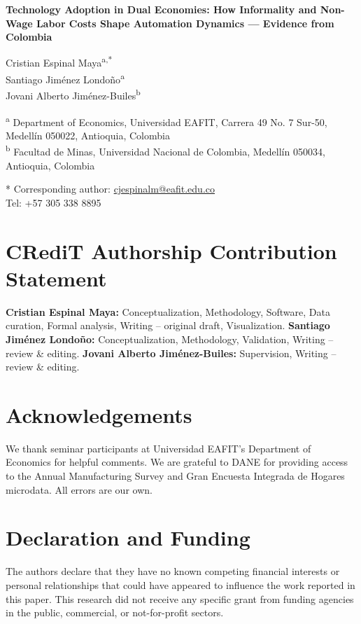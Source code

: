 \documentclass[12pt]{article}
\begin{document}
\begin{center}
{\LARGE\bfseries Technology Adoption in Dual Economies: How Informality and Non-Wage Labor Costs Shape Automation Dynamics --- Evidence from Colombia}
\vspace{1cm}

{\large Cristian Espinal Maya\textsuperscript{a,*} }\\
{\large Santiago Jim\'enez Londo\~no\textsuperscript{a} }\\
{\large Jovani Alberto Jim\'enez-Builes\textsuperscript{b} }

\vspace{0.5cm}
\textsuperscript{a} Department of Economics, Universidad EAFIT, Carrera 49 No. 7 Sur-50, Medell\'in 050022, Antioquia, Colombia\\
\textsuperscript{b} Facultad de Minas, Universidad Nacional de Colombia, Medell\'in 050034, Antioquia, Colombia

\vspace{0.5cm}
* Corresponding author: \href{mailto:cjespinalm@eafit.edu.co}{cjespinalm@eafit.edu.co}\\
Tel: +57 305 338 8895
\end{center}

\vspace{1cm}
\section*{CRediT Authorship Contribution Statement}

\textbf{Cristian Espinal Maya:} Conceptualization, Methodology, Software, Data curation, Formal analysis, Writing -- original draft, Visualization.
\textbf{Santiago Jim\'enez Londo\~no:} Conceptualization, Methodology, Validation, Writing -- review \& editing.
\textbf{Jovani Alberto Jim\'enez-Builes:} Supervision, Writing -- review \& editing.

\section*{Acknowledgements}

We thank seminar participants at Universidad EAFIT's Department of Economics for helpful comments. We are grateful to DANE for providing access to the Annual Manufacturing Survey and Gran Encuesta Integrada de Hogares microdata. All errors are our own.

\section*{Declaration and Funding}

The authors declare that they have no known competing financial interests or personal relationships that could have appeared to influence the work reported in this paper. This research did not receive any specific grant from funding agencies in the public, commercial, or not-for-profit sectors.
\end{document}
